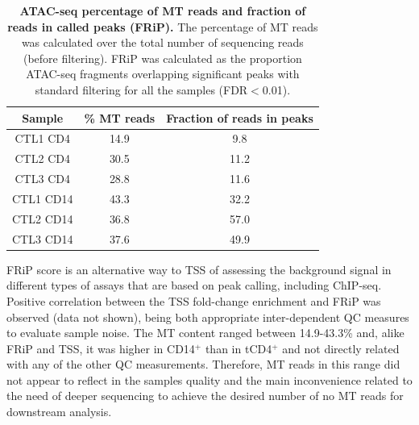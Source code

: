 \begin{table}[htbp]
\centering
\begin{tabular}{@{} c c c}
\toprule
\textbf{Sample} & \textbf{\% MT reads} & \textbf{Fraction of reads in peaks} \\
\midrule
\midrule
CTL1 CD4 & 14.9 & 9.8 \\
CTL2 CD4 & 30.5 & 11.2 \\
CTL3 CD4 & 28.8 & 11.6 \\
CTL1 CD14 & 43.3 & 32.2 \\
CTL2 CD14 & 36.8 & 57.0 \\
CTL3 CD14 & 37.6 & 49.9 \\
\bottomrule
\end{tabular}
\medskip %
\caption[ATAC-seq percentage of MT reads and fraction of reads in called peaks (FRiP).]{\textbf{ATAC-seq percentage of MT reads and fraction of reads in called peaks (FRiP).} The percentage of MT reads was calculated over the total number of sequencing reads (before filtering). FRiP was calculated as the proportion ATAC-seq fragments overlapping significant peaks with standard filtering for all the samples (FDR$<$0.01).}
\label{tab:ATAC_MT_fraction_reads_in_peaks}
\end{table}
\bigskip %


FRiP score is an alternative way to TSS of assessing the background signal in different types of assays that are based on peak calling, including ChIP-seq. Positive correlation between the TSS fold-change enrichment and FRiP was observed (data not shown), being both appropriate inter-dependent QC measures to evaluate sample noise.  The MT content ranged between 14.9-43.3\% and, alike FRiP and TSS, it was higher in CD14$^+$ than in tCD4$^+$ and not directly related with any of the other QC measurements. Therefore, MT reads in this range did not appear to reflect in the samples quality and the main inconvenience related to the need of deeper sequencing to achieve the desired number of no MT reads for downstream analysis.

